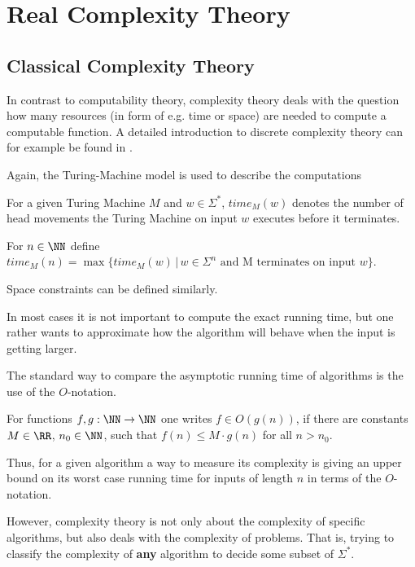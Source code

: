 \section{Real Complexity Theory}\label{section:real_complexity}
	\subsection{Classical Complexity Theory}
    In contrast to computability theory, complexity theory deals with the
    question how many resources (in form of e.g. time or space) are needed to
    compute a computable function.
    A detailed introduction to discrete complexity theory can for example be
    found in \cite{complexity}.

    Again, the Turing-Machine model is used to describe the computations
		\begin{definition}
			For a given Turing Machine $M$ and $w \in \Sigma^*$, $time_M(w)$ denotes the number of head movements 
			the Turing Machine on input $w$ executes before it terminates. 

			For $n \in \NN$ define $time_M(n) = \max \{ time_M(w) \,|\, w \in
        \Sigma^n \text{ and M terminates on input }w \}$.

        Space constraints can be defined similarly.
		\end{definition}
    In most cases it is not important to compute the exact running time, but
    one rather wants to approximate how the algorithm will behave when the
    input is getting larger.
    
    The standard way to compare the asymptotic running time of algorithms is
    the use of the $O$-notation.
		\begin{definition}
			For functions $f, g: \NN \to \NN$ one writes $f \in O(g(n))$, if there are constants $M \in \RR$, $n_0 \in \NN$, such that
			$ f(n) \leq M \cdot g(n)$ for all $n > n_0$. 
		\end{definition}
			Thus, for a given algorithm a way to measure its complexity is giving an
      upper bound on its worst case running time for inputs of length $n$ in
      terms of the $O$-notation. 

			However, complexity theory is not only about the complexity of specific
      algorithms, but also deals with the complexity of problems. 
      That is, trying to classify the complexity of \textbf{any} algorithm to
      decide some subset of $\Sigma^*$.
      
